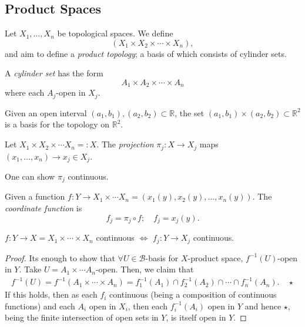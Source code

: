 \subsection{Product Spaces}

\begin{definition}
    Let $X_1, \dots, X_n$ be topological spaces. We define \[
    (X_1 \times X_2 \times \cdots \times X_n),    
    \]
    and aim to define a \emph{product topology}; a basis of which consists of cylinder sets.
\end{definition}

\begin{definition}
    A \emph{cylinder set} has the form $$A_1 \times A_2 \times \cdots \times A_n$$ where each $A_j$-open in $X_j$.
\end{definition}

\begin{example}
    Given an open interval $(a_1, b_1), (a_2, b_2) \subset \mathbb{R}$, the set $(a_1, b_1) \times (a_2, b_2) \subset \mathbb{R}^2$ is a basis for the topology on $\mathbb{R}^2$.
\end{example}

\begin{definition}[Projection]
    Let $X_1 \times X_2 \times \cdots X_n =: X$. The \emph{projection} $\pi_j: X \to X_j$ maps $(x_1, \dots, x_n) \to x_j \in X_j$.
\end{definition}

\begin{remark}
    One can show $\pi_j$ continuous.
\end{remark}

\begin{definition}
    Given a function $f: Y \to X_1 \times \cdots X_n = (x_1(y), x_2(y), \dots, x_n(y))$. The \emph{coordinate function} is $$f_j = \pi_j \circ f;\quad  f_j = x_j(y).$$
\end{definition}

\begin{proposition}\label{prop:finitecontinuousproducspace}
    $f: Y \to X = X_1 \times \cdots \times X_n$ continuous $\iff$ $f_j : Y \to X_j$ continuous.
\end{proposition}

\begin{proof}
    Its enough to show that $\forall U \in \mathcal{B}$-basis for $X$-product space, $f^{-1}(U)$-open in $Y$. Take $U = A_1 \times \cdots A_n$-open. Then, we claim that \begin{align*}
        f^{-1}(U) = f^{-1}(A_1 \times \cdots \times A_n) = f_1^{-1}(A_1) \cap f_2^{-1}(A_2)\cap \cdots \cap f_n^{-1}(A_n). \quad \star
    \end{align*}
    If this holds, then as each $f_i$ continuous (being a composition of continuous functions) and each $A_i$ open in $X_i$, then each $f_i^{-1}(A_i)$ open in $Y$ and hence $\star$, being the finite intersection of open sets in $Y$, is itself open in $Y$.

\end{proof}

